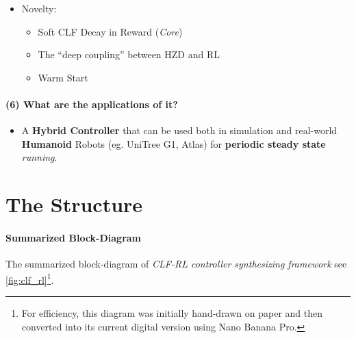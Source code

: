 \documentclass{article}
\begin{document}
\begin{itemize}
\begin{itemize}
\begin{itemize}
\begin{itemize}
\begin{itemize}
          \item \textbf{Soft Penalty}: From \textit{``Discrete Discrimination''} (\textit{Eq. 8}) to \textit{``Continuous Guidance''} (\textit{Eq. 14});
          \item Hinge-like.
        \end{itemize}
        \item Other Rewards \& Penalties: SSP Domain Reward, FLT Contact Forces Penalty, L2 \& Hinge-like Regularization Penalties.
      \end{itemize}
      \item Other Design Tricks:
      \begin{itemize}
        \item Robustness to \textbf{Disturbances}: RL learning with domain \textbf{randomization}, facilitating sim-to-real transfer (avoiding model \textit{mismatch} and preventing \textit{over exploitation});
        \item Straight Running: \textbf{Layered} Control Architecture with extra independent PD Controllers.
      \end{itemize}
    \end{itemize}
  \end{itemize}
  \item Novelty:
  \begin{itemize}
    \item Soft CLF Decay in Reward (\textit{Core})
    \item The ``deep coupling'' between HZD and RL
    \item Warm Start
  \end{itemize}
\end{itemize}


\paragraph{(6) What are the applications of it?} 
\begin{itemize}
  \item A \textbf{Hybrid Controller} that can be used both in simulation and real-world \textbf{Humanoid} Robots (eg. UniTree G1, Atlas) for \textbf{periodic steady state} \textit{running}.
\end{itemize}

\section{The Structure}

\paragraph{Summarized Block-Diagram} 
The summarized block-diagram of \textit{CLF-RL controller synthesizing framework} see \cref{fig:clf_rl}\footnote{For efficiency, this diagram was initially hand-drawn on paper and then converted into its current digital version using Nano Banana Pro.}.
\end{document}
